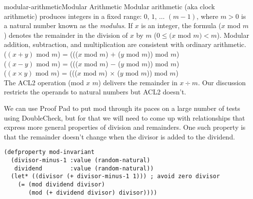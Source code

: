 \begin{aside}{modular-arithmetic}{Modular Arithmetic}
Modular
arithmetic (aka clock arithmetic)
produces integers in a fixed range: $0$, $1$, $\dots$ $(m - 1)$,
where $m > 0$ is a natural number known as the
\emph{modulus}.
If $x$ is an integer, the formula ($x$ mod $m$) denotes
the remainder in the division of $x$ by $m$
($0 \leq (x$ mod $m) < m$).
Modular addition, subtraction, and multiplication
are consistent with ordinary arithmetic.\\
\hspace*{15mm}($(x + y)$ mod $m$) = ((($x$ mod $m$) $+$ ($y$ mod $m$)) mod $m$) \\
\hspace*{15mm}($(x - y)$ mod $m$) = ((($x$ mod $m$) $-$ ($y$ mod $m$)) mod $m$) \\
\hspace*{15mm}($(x \times y)$ mod $m$) = ((($x$ mod $m$) $\times$ ($y$ mod $m$)) mod $m$)\\
The ACL2 operation
(\textsf{mod} $x$ $m$) delivers the remainder in $x \div m$.
Our discussion restricts the operands to natural numbers
but ACL2 doesn't.
\end{aside}

We can use Proof Pad to put \textsf{mod}
through its paces on a large number of tests using DoubleCheck,
but for that we will need to come up with relationships
that express more general properties of division and remainders.
One such property is that the remainder doesn't change
when the divisor is added to the dividend.

\begin{code}
\begin{verbatim}
(defproperty mod-invariant
  (divisor-minus-1 :value (random-natural)
   dividend        :value (random-natural))
  (let* ((divisor (+ divisor-minus-1 1))) ; avoid zero divisor
    (= (mod dividend divisor)
       (mod (+ dividend divisor) divisor))))
\end{verbatim}
\end{code}

